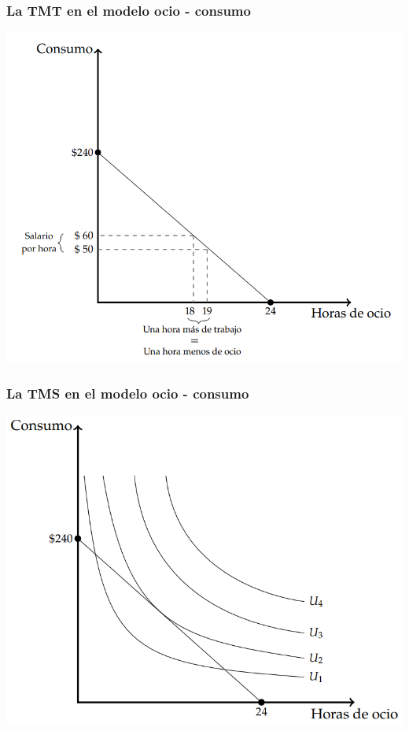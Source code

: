 \documentclass{beamer}
\begin{document}
\begin{frame}
\frametitle{La TMT en el modelo ocio - consumo}
  \begin{center}
    \includegraphics[scale=0.6]{../Figures/C9.2.png}
  \end{center}
\end{frame}

\begin{frame}
  \frametitle{La TMS en el modelo ocio - consumo}
  \begin{center}
    \includegraphics[scale=0.6]{../Figures/C9.3.png}
  \end{center}
\end{frame}
\end{document}
